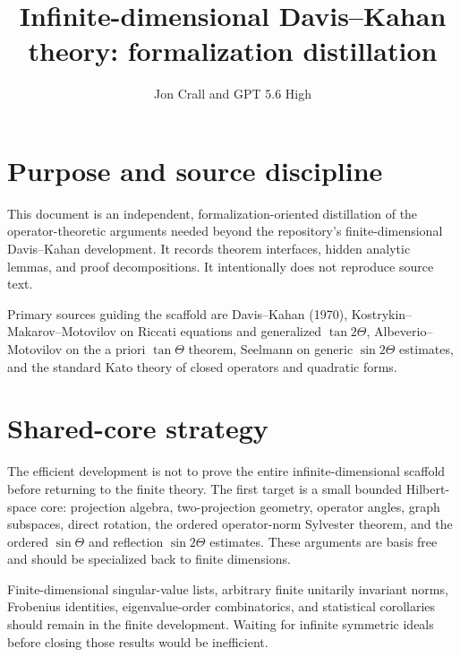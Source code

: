 \documentclass{article}
\title{Infinite-dimensional Davis--Kahan theory: formalization distillation}
\author{Jon Crall and GPT 5.6 High}
\begin{document}
\maketitle

\section{Purpose and source discipline}
This document is an independent, formalization-oriented distillation of the
operator-theoretic arguments needed beyond the repository's finite-dimensional
Davis--Kahan development.  It records theorem interfaces, hidden analytic
lemmas, and proof decompositions.  It intentionally does not reproduce source
text.

Primary sources guiding the scaffold are Davis--Kahan (1970),
Kostrykin--Makarov--Motovilov on Riccati equations and generalized
$\tan 2\Theta$, Albeverio--Motovilov on the a priori $\tan\Theta$ theorem,
Seelmann on generic $\sin 2\Theta$ estimates, and the standard Kato theory of
closed operators and quadratic forms.


\section{Shared-core strategy}
The efficient development is not to prove the entire infinite-dimensional
scaffold before returning to the finite theory.  The first target is a small
bounded Hilbert-space core: projection algebra, two-projection geometry,
operator angles, graph subspaces, direct rotation, the ordered operator-norm
Sylvester theorem, and the ordered $\sin\Theta$ and reflection
$\sin 2\Theta$ estimates.  These arguments are basis free and should be
specialized back to finite dimensions.

Finite-dimensional singular-value lists, arbitrary finite unitarily invariant
norms, Frobenius identities, eigenvalue-order combinatorics, and statistical
corollaries should remain in the finite development.  Waiting for infinite
symmetric ideals before closing those results would be inefficient.
\end{document}
